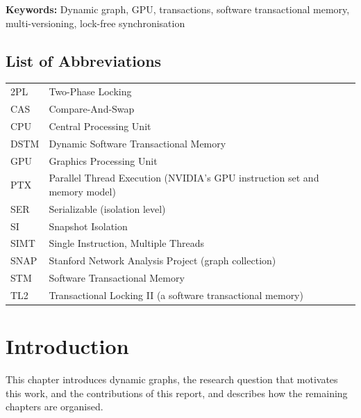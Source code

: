 \documentclass[11pt,a4paper,oneside]{report}
\begin{document}
\vspace{0.2cm}
\textbf{Keywords:} Dynamic graph, GPU, transactions, software transactional memory, multi-versioning, lock-free
synchronisation
\clearpage

\begin{singlespace}
\tableofcontents
\clearpage
{}
\listoffigures
\clearpage
{}
\listoftables
\clearpage
\chapter*{List of Abbreviations}
\begin{tabular}{@{}p{2.6cm}l@{}}
2PL & Two-Phase Locking \\
CAS & Compare-And-Swap \\
CPU & Central Processing Unit \\
DSTM & Dynamic Software Transactional Memory \\
GPU & Graphics Processing Unit \\
PTX & Parallel Thread Execution (NVIDIA's GPU instruction set and memory model) \\
SER & Serializable (isolation level) \\
SI & Snapshot Isolation \\
SIMT & Single Instruction, Multiple Threads \\
SNAP & Stanford Network Analysis Project (graph collection) \\
STM & Software Transactional Memory \\
TL2 & Transactional Locking II (a software transactional memory) \\
\end{tabular}
\end{singlespace}
\clearpage

\pagestyle{fancy}
\hypersetup{pageanchor=true}

\chapter{Introduction}
\label{ch:intro}
This chapter introduces dynamic graphs, the research question that motivates this work, and the contributions of this
report, and describes how the remaining chapters are organised.
\end{document}
